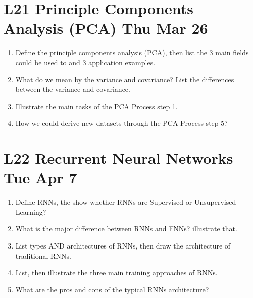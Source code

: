 \documentclass[12pt]{article}
\newenvironment{QandA}{\begin{enumerate}[label=\bfseries\arabic*.]\bfseries}
{\end{enumerate}}
\newenvironment{answered}{\par\normalfont\color{Sepia}}{}
\begin{document}
\section*{L21 Principle Components Analysis (PCA) \textemdash{} Thu Mar 26}
\begin{QandA}
    \item Define the principle components analysis (PCA), then list the 3 main fields could be used to and 3 application examples.
    \begin{answered}
    \end{answered}

    \item What do we mean by the variance and covariance? List the differences between the variance and covariance.
    \begin{answered}
    \end{answered}

    \item Illustrate the main tasks of the PCA Process \textemdash{} step 1.
    \begin{answered}
    \end{answered}

    \item How we could derive new datasets through the PCA Process \textemdash{} step 5?
    \begin{answered}
    \end{answered}

\end{QandA}

\section*{L22 Recurrent Neural Networks \textemdash{} Tue Apr 7}
\begin{QandA}
    \item Define RNNs, the show whether RNNs are Supervised or Unsupervised Learning?
    \begin{answered}
    \end{answered}

    \item What is the major difference between RNNs and FNNs? illustrate that.
    \begin{answered}
    \end{answered}

    \item List types AND architectures of RNNs, then draw the architecture of traditional RNNs.
    \begin{answered}
    \end{answered}

    \item List, then illustrate the three main training approaches of RNNs.
    \begin{answered}
    \end{answered}

    \item What are the pros and cons of the typical RNNs architecture?
    \begin{answered}
    \end{answered}

\end{QandA}
\end{document}
